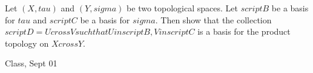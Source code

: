 \begin{samepage}
\begin{ex}
Let $(X, tau)$ and $(Y, sigma)$ be two topological spaces. Let $script B$ be a basis for $tau$ and $script C$ be a basis for $sigma$. 
Then show that the collection $script D = {{ U cross V such that U in script B, V in script C }}$ is a basis for the product topology on
 $X cross Y$.
\end{ex}
\begin{source}
Class, Sept 01
\end{source}
\end{samepage}
